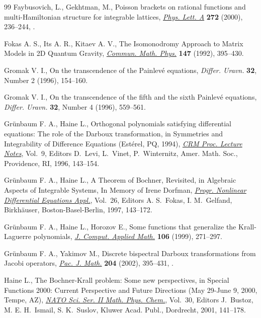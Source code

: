 \documentclass[10pt, reqno]{amsart}
\numberwithin{equation}{section}
\numberwithin{equation}{section}
\begin{document}
\begin{thebibliography}{99}
Faybusovich, L., Gekhtman, M., 
Poisson brackets on rational functions and multi-Hamiltonian structure for integrable lattices, 
\href{https://doi.org//10.1016/S0375-9601(00)00445-X}{\textit{Phys. Lett. A}} \textbf{272} (2000), 236--244, 
.

Fokas A. S., Its A. R., Kitaev A. V., 
The Isomonodromy Approach to Matrix Models in 2D Quantum Gravity, 
\href{https://doi.org//10.1007/BF02096594}{\textit{Commun. Math. Phys.}} \textbf{147} (1992), 395--430.

Gromak V. I., 
On the transcendence of the Painlevé equations, 
\textit{Differ. Uravn.} \textbf{32}, Number 2 (1996), 154--160.

Gromak V. I., 
On the transcendence of the fifth and the sixth Painlevé equations, 
\textit{Differ. Uravn.} \textbf{32}, Number 4 (1996), 559--561.

Grünbaum F. A., Haine L., 
Orthogonal polynomials satisfying differential equations: The role of the Darboux transformation, in Symmetries and Integrability of Difference Equations (Estérel, PQ, 1994), 
\href{https://pubs.ams.org/ebooks/crmp/009}{\textit{CRM Proc. Lecture Notes}}, Vol.~9, 
Editors D.~Levi, L.~Vinet, P.~Winternitz, Amer. Math. Soc., Providence, RI, 1996, 143--154.

Grünbaum F. A., Haine L., 
A Theorem of Bochner, Revisited, in Algebraic Aspects of Integrable Systems, In Memory of Irene Dorfman, 
\href{https://doi.org/10.1007/978-1-4612-2434-1_8}{\textit{Progr. Nonlinear Differential Equations Appl.}}, Vol.~26, 
Editors A. S.~Fokas, I. M.~Gelfand, Birkhäuser, Boston-Basel-Berlin, 1997, 143--172.

Grünbaum F. A., Haine L., Horozov E., 
Some functions that generalize the Krall-Laguerre polynomials, 
\href{https://doi.org//10.1016/S0377-0427(99)00069-2}{\textit{J. Comput. Applied Math.}} \textbf{106} (1999), 271--297.

Grünbaum F. A., Yakimov M., 
Discrete bispectral Darboux transformations from Jacobi operators, 
\href{https://doi.org//10.2140/pjm.2002.204.395}{\textit{Pac. J. Math.}} \textbf{204} (2002), 395--431, .

Haine L., 
The Bochner-Krall problem: Some new perspectives, in Special Functions 2000: Current Perspective and Future Directions (May 29-June 9, 2000, Tempe, AZ), 
\href{https://doi.org//10.1007/978-94-010-0818-1_7}{\textit{NATO Sci. Ser. II Math. Phys. Chem.}}, Vol.~30, 
Editors J.~Bustoz, M. E. H.~Ismail, S. K.~Suslov, Kluwer Acad. Publ., Dordrecht, 2001, 141--178.


\end{thebibliography}
\end{document}
